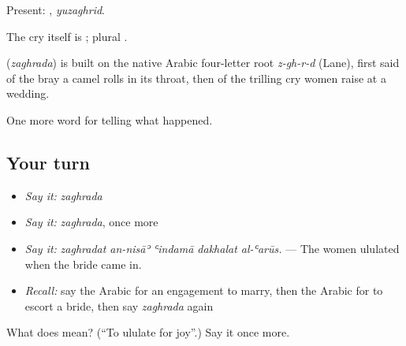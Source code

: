Present: , \emph{yuzaghrid}.

The cry itself is ; plural .

\begin{cousinweb}
\textbf{} (\emph{zaghrada}) is built on the native Arabic four-letter root \emph{z-gh-r-d} (Lane), first said of the bray a camel rolls in its throat, then of the trilling cry women raise at a wedding.
\end{cousinweb}

\begin{grammarlens}[title={What you've built}]
One more word for telling what happened.
\end{grammarlens}

\subsection*{Your turn}
\begin{itemize}
\raggedright
  \item \emph{Say it:} \emph{zaghrada}
  \item \emph{Say it:} \emph{zaghrada}, once more
  \item \emph{Say it:} \emph{zaghradat an-nisāʾ ʿindamā dakhalat al-ʿarūs.} — The women ululated when the bride came in.
  \item \emph{Recall:} say the Arabic for an engagement to marry, then the Arabic for to escort a bride, then say \emph{zaghrada} again
\end{itemize}

\begin{tcolorbox}[breakable,colback=teal!4,colframe=teal!35!black,title={Before you move on}]
What does  mean? (\textquotedblleft{}To ululate for joy\textquotedblright{}.) Say it once more.
\end{tcolorbox}

